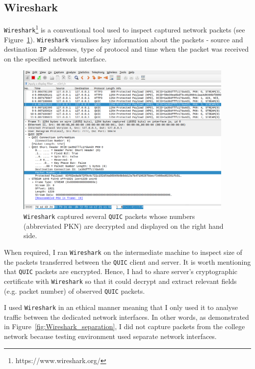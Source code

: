 \documentclass[12pt,a4paper,twoside,openright]{report}
\begin{document}
\subsection{Wireshark}

\texttt{Wireshark}\footnote{https://www.wireshark.org/} is a conventional tool used to inspect captured network packets (see Figure~\ref{fig:Wireshark_screenshot}).
\texttt{Wireshark} visualises key information about the packets - source and destination \texttt{IP} addresses, type of protocol and time when the packet was received on the specified network interface.

    \begin{figure}[H]
    \centering
    \includegraphics[width=0.95\textwidth]{figs/Wireshark_screenshot.png}
    \caption{\texttt{Wireshark} captured several \texttt{QUIC} packets whose numbers (abbreviated PKN) are decrypted and displayed on the right hand side.}
    \label{fig:Wireshark_screenshot}
    \end{figure}
    
When required, I ran \texttt{Wireshark} on the intermediate machine to inspect size of the packets transferred between the \texttt{QUIC} client and server.
It is worth mentioning that \texttt{QUIC} packets are encrypted.
Hence, I had to share server's cryptographic certificate with \texttt{Wireshark} so that it could decrypt and extract relevant fields (e.g. packet number) of observed \texttt{QUIC} packets.

I used \texttt{Wireshark} in an ethical manner meaning that I only used it to analyse traffic between the dedicated network interfaces.
In other words, as demonstrated in Figure~\ref{fig:Wireshark_separation}, I did not capture packets from the college network because testing environment used separate network interfaces. 
\end{document}
